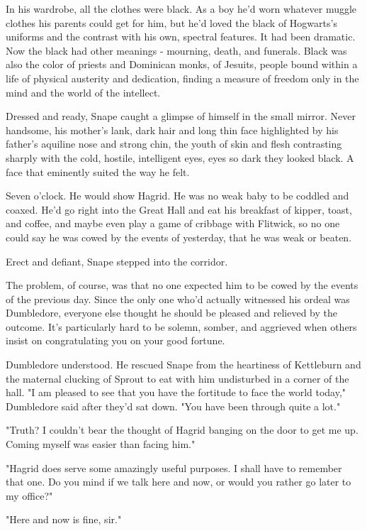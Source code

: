 In his wardrobe, all the clothes were black. As a boy he'd worn whatever muggle clothes his parents could get for him, but he'd loved the black of Hogwarts's uniforms and the contrast with his own, spectral features. It had been dramatic. Now the black had other meanings - mourning, death, and funerals. Black was also the color of priests and Dominican monks, of Jesuits, people bound within a life of physical austerity and dedication, finding a measure of freedom only in the mind and the world of the intellect.

Dressed and ready, Snape caught a glimpse of himself in the small mirror. Never handsome, his mother's lank, dark hair and long thin face highlighted by his father's aquiline nose and strong chin, the youth of skin and flesh contrasting sharply with the cold, hostile, intelligent eyes, eyes so dark they looked black. A face that eminently suited the way he felt.

Seven o'clock. He would show Hagrid. He was no weak baby to be coddled and coaxed. He'd go right into the Great Hall and eat his breakfast of kipper, toast, and coffee, and maybe even play a game of cribbage with Flitwick, so no one could say he was cowed by the events of yesterday, that he was weak or beaten.

Erect and defiant, Snape stepped into the corridor.

The problem, of course, was that no one expected him to be cowed by the events of the previous day. Since the only one who'd actually witnessed his ordeal was Dumbledore, everyone else thought he should be pleased and relieved by the outcome. It's particularly hard to be solemn, somber, and aggrieved when others insist on congratulating you on your good fortune.

Dumbledore understood. He rescued Snape from the heartiness of Kettleburn and the maternal clucking of Sprout to eat with him undisturbed in a corner of the hall. "I am pleased to see that you have the fortitude to face the world today," Dumbledore said after they'd sat down. "You have been through quite a lot."

"Truth? I couldn't bear the thought of Hagrid banging on the door to get me up. Coming myself was easier than facing him."

"Hagrid does serve some amazingly useful purposes. I shall have to remember that one. Do you mind if we talk here and now, or would you rather go later to my office?"

"Here and now is fine, sir."


